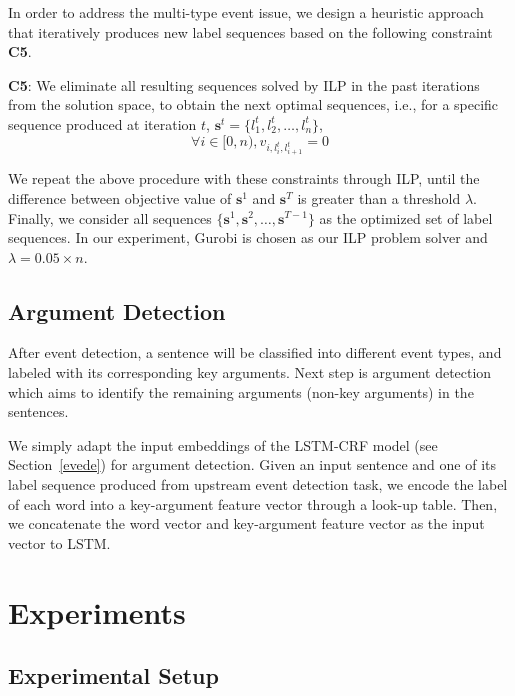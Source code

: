 \documentclass{article}
\begin{document}
In order to address the multi-type event issue, we design a heuristic approach that iteratively produces new label sequences based on the following constraint \textbf{C5}.

\textbf{C5}: We eliminate all resulting sequences solved by ILP in the past iterations from the solution space, to obtain the next optimal sequences, i.e., for a specific sequence produced at iteration $t$, $\bm{s}^t=\{l_1^t, l_2^t, \ldots, l_n^t\}$,  
\begin{equation}
	\forall i \in {[0, n)}, v_{i,l_i^t ,l_{i+1}^t} = 0	
\end{equation}

We repeat the above procedure with these constraints through ILP, until the difference between objective value of $\bm{s}^1$ and $\bm{s}^T$ is greater than a threshold $\lambda$. Finally, we consider all sequences $\{\bm{s}^1, \bm{s}^2, \ldots, \bm{s}^{T-1}\}$ as the optimized set of label sequences. In our experiment, Gurobi \cite{gurobi} is chosen as our ILP problem solver and $\lambda=0.05 \times n$.

\subsection{Argument Detection}
After event detection, a sentence will be classified into different event types, and labeled with its corresponding key arguments. Next step is argument detection which aims to identify the remaining arguments (non-key arguments) in the sentences.  

We simply adapt the input embeddings of the LSTM-CRF model (see Section~\ref{evede}) for argument detection. Given an input sentence and one of its label sequence produced from upstream event detection task, we encode the label of each word into a key-argument feature vector through a look-up table. Then, we concatenate the word vector and key-argument feature vector as the input vector to LSTM.

\section{Experiments}

\subsection{Experimental Setup}
\end{document}
